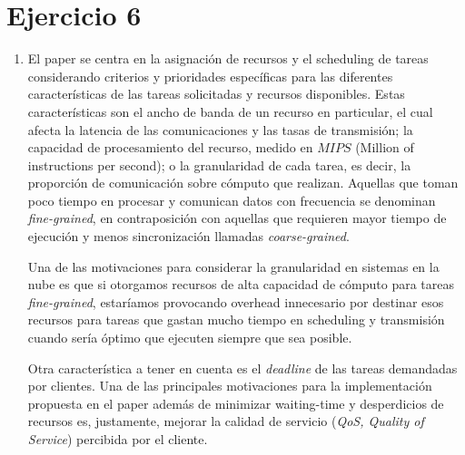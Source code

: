 \section{Ejercicio 6}

\begin{enumerate}[label=\alph*)]

    \item






	El paper se centra en la asignación de recursos y el scheduling de tareas considerando criterios y prioridades específicas para las diferentes características de las tareas solicitadas y recursos disponibles. Estas características son el ancho de banda de un recurso en particular, el cual afecta la latencia de las comunicaciones y las tasas de transmisión;
la capacidad de procesamiento del recurso, medido en $MIPS$ (Million of instructions per second); o la granularidad de cada tarea, es decir, la proporción de comunicación sobre cómputo que realizan. Aquellas que toman poco tiempo en procesar y comunican datos con frecuencia se denominan \emph{fine-grained}, en contraposición con aquellas que requieren mayor tiempo de ejecución y menos sincronización llamadas \emph{coarse-grained}. 

	Una de las motivaciones para considerar la granularidad en sistemas en la nube es que si otorgamos recursos de alta capacidad de cómputo para tareas \emph{fine-grained}, estaríamos provocando overhead innecesario por destinar esos recursos para tareas que gastan mucho tiempo en scheduling y transmisión cuando sería óptimo que ejecuten siempre que sea posible.
	
	Otra característica a tener en cuenta es el \emph{deadline} de las tareas demandadas por clientes. Una de las principales motivaciones para la implementación propuesta en el paper además de minimizar waiting-time y desperdicios de recursos es, justamente, mejorar la calidad de servicio (\emph{QoS, Quality of Service}) percibida por el cliente.


\end{enumerate}
